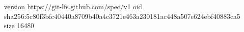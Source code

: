 version https://git-lfs.github.com/spec/v1
oid sha256:5c80f3bfc40440a8709b40a4c3721e463a230181ac448a507e624ebf40883ca5
size 16480
